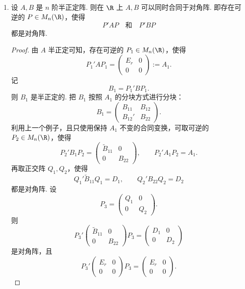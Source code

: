 \begin{example}
\begin{enumerate}
\[		\]
		的形式.
		\begin{proof}
			若 $A(1,1)\ne0$，则利用合同变换可以把 $B$ 的第 $1$ 行和第 $1$ 列变为 $0$；若 $A(1,1)=0$，则由上一个例子可知对应的行列本来就是 $0$. 类似地，依次考虑 $A(2,2),\cdots,A(r,r)$，即可把非对角块 $B,B'$ 化为 $0$，得到所需的分块对角形式.
		\end{proof}
		\item 设 $A,B$ 是 $n$ 阶半正定阵. 则在 $\R$ 上 $A,B$ 可以同时合同于对角阵. 即存在可逆的 $P\in M_n(\R)$，使得
		\[
		P'AP\quad\text{和}\quad P'BP
		\]
		都是对角阵.
		\begin{proof}
			由 $A$ 半正定可知，存在可逆的 $P_1\in M_n(\R)$，使得
			\[
			P_1'AP_1=\begin{pmatrix}
				E_r&0\\
				0&0
			\end{pmatrix}:=A_1.
			\]
			记
			\[
			B_1=P_1'BP_1.
			\]
			则 $B_1$ 是半正定的. 把 $B_1$ 按照 $A_1$ 的分块方式进行分块：
			\[
			B_1=\begin{pmatrix}
				B_{11}&B_{12}\\
				B_{12}'&B_{22}
			\end{pmatrix}.
			\]
			利用上一个例子，且只使用保持 $A_1$ 不变的合同变换，可取可逆的 $P_2\in M_n(\R)$，使得
			\[
			P_2'B_1P_2=\begin{pmatrix}
				\widetilde B_{11}&0\\
				0&B_{22}
			\end{pmatrix},
			\qquad
			P_2'A_1P_2=A_1.
			\]
			再取正交阵 $Q_1,Q_2$，使得
			\[
			Q_1'\widetilde B_{11}Q_1=D_1,
			\qquad
			Q_2'B_{22}Q_2=D_2
			\]
			都是对角阵. 设
			\[
			P_3=\begin{pmatrix}
				Q_1&0\\
				0&Q_2
			\end{pmatrix}.
			\]
			则
			\[
			P_3'
			\begin{pmatrix}
				\widetilde B_{11}&0\\
				0&B_{22}
			\end{pmatrix}
			P_3=
			\begin{pmatrix}
				D_1&0\\
				0&D_2
			\end{pmatrix}
			\]
			是对角阵，且
			\[
			P_3'
			\begin{pmatrix}
				E_r&0\\
				0&0
			\end{pmatrix}
			P_3=
			\begin{pmatrix}
				E_r&0\\
				0&0
			\end{pmatrix}.
\]
\end{proof}
\end{enumerate}
\end{example}
